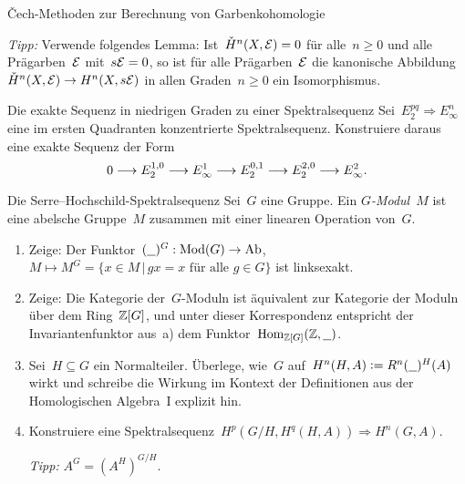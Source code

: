 \documentclass{uebblatt}
\begin{document}
\begin{aufgabe}{Čech-Methoden zur Berechnung von Garbenkohomologie}
\begin{enumerate}
{\tiny\emph{Tipp:} Verwende folgendes Lemma: Ist~$\check H^n(X,\mathcal{E}) = 0$ für
alle~$n \geq 0$ und alle Prägarben~$\mathcal{E}$ mit~$s\mathcal{E} = 0$, so ist für alle
Prägarben~$\mathcal{E}$ die kanonische Abbildung~$\check H^n(X,\mathcal{E}) \to H^n(X,s\mathcal{E})$ in
allen Graden~$n \geq 0$ ein Isomorphismus.\par}
\end{enumerate}
\end{aufgabe}

\begin{aufgabe}{Die exakte Sequenz in niedrigen Graden zu einer
Spektralsequenz}
Sei~$E_2^{pq} \Rightarrow E_\infty^n$ eine im ersten Quadranten konzentrierte
Spektralsequenz. Konstruiere daraus eine exakte Sequenz der Form
\[ 0 \longrightarrow E_2^{1,0} \longrightarrow E^1_\infty \longrightarrow E_2^{0,1} \longrightarrow E_2^{2,0} \longrightarrow
E^2_\infty. \]
\end{aufgabe}
\vspace{-1.5em}

\begin{aufgabe}{Die Serre--Hochschild-Spektralsequenz}
Sei~$G$ eine Gruppe. Ein \emph{$G$-Modul}~$M$ ist eine abelsche Gruppe~$M$
zusammen mit einer linearen Operation von~$G$.
\begin{enumerate}
\item Zeige: Der Funktor~$(\underline{\ \ })^G : \mathrm{Mod}(G) \to \mathrm{Ab}$, $M \mapsto M^G = \{ x \in M \,|\,
\text{$gx = x$ für alle $g \in G$} \}$ ist linksexakt.
\item Zeige: Die Kategorie der~$G$-Moduln ist äquivalent zur Kategorie der
Moduln über dem Ring~$\mathbb{Z}[G]$, und unter dieser Korrespondenz entspricht der
Invariantenfunktor aus~a) dem Funktor~$\mathrm{Hom}_{\mathbb{Z}[G]}(\mathbb{Z}, \underline{\ \ })$.
\item Sei~$H \subseteq G$ ein Normalteiler. Überlege, wie~$G$ auf~$H^n(H,A)
\vcentcolon= R^n(\underline{\ \ })^H(A)$ wirkt und schreibe die Wirkung im Kontext
der Definitionen aus der Homologischen Algebra~I explizit hin.
\item Konstruiere eine Spektralsequenz~$H^p(G/H, H^q(H,A))
\Rightarrow H^n(G,A)$.
{\tiny\emph{Tipp:} $A^G = (A^H)^{G/H}$.\par}
\end{enumerate}
\end{aufgabe}
\end{document}
